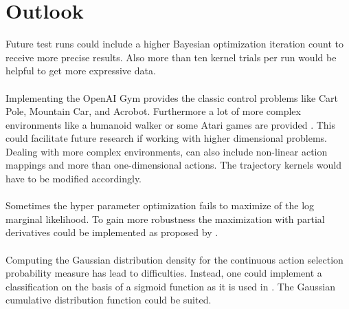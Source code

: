 \chapter{Outlook}
\label{chap:7}

Future test runs could include a higher Bayesian optimization iteration count to receive more precise results. Also more than ten kernel trials per run would be helpful to get more expressive data.\\
\\
Implementing the OpenAI Gym provides the classic control problems like Cart Pole, Mountain Car, and Acrobot. Furthermore a lot of more complex environments like a humanoid walker or some Atari games are provided \cite{DBLP:journals/corr/BrockmanCPSSTZ16}. This could facilitate future research if working with higher dimensional problems.\\
Dealing with more complex environments, can also include non-linear action mappings and more than one-dimensional actions. The trajectory kernels would have to be modified accordingly.\\
\\
Sometimes the hyper parameter optimization fails to maximize of the log marginal likelihood. To gain more robustness the maximization with partial derivatives could be implemented as proposed by \cite{rasmussen2006gaussian, lizotte2008practical}.\\
\\
Computing the Gaussian distribution density for the continuous action selection probability measure has lead to difficulties. Instead, one could implement a classification on the basis of a sigmoid function as it is used in \cite{rasmussen2006gaussian}. The Gaussian cumulative distribution function could be suited.\\
\\
